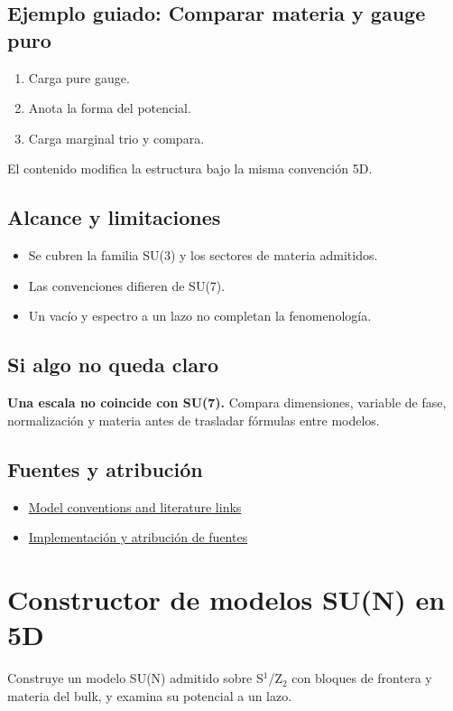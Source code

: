 \documentclass[11pt,a4paper]{article}
\begin{document}
\subsection*{Ejemplo guiado: Comparar materia y gauge puro}
\begin{enumerate}
\item Carga pure gauge.
\item Anota la forma del potencial.
\item Carga marginal trio y compara.
\end{enumerate}
El contenido modifica la estructura bajo la misma convención 5D.
\subsection*{Alcance y limitaciones}
\begin{itemize}
\item Se cubren la familia SU(3) y los sectores de materia admitidos.
\item Las convenciones difieren de SU(7).
\item Un vacío y espectro a un lazo no completan la fenomenología.
\end{itemize}
\subsection*{Si algo no queda claro}
\textbf{Una escala no coincide con SU(7).} Compara dimensiones, variable de fase, normalización y materia antes de trasladar fórmulas entre modelos.

\subsection*{Fuentes y atribución}
\begin{itemize}
\item \href{https://karlesmarin.github.io/ghu-explorer/docs/index.html}{Model conventions and literature links}
\item \href{https://github.com/karlesmarin/ghu-lab/blob/main/src/sections/fived_section.js}{Implementación y atribución de fuentes}
\end{itemize}
\section{Constructor de modelos SU(N) en 5D}
Construye un modelo SU(N) admitido sobre S\ensuremath{{}^{1}}/Z\ensuremath{{}_{2}} con bloques de frontera y materia del bulk, y examina su potencial a un lazo.
\end{document}
